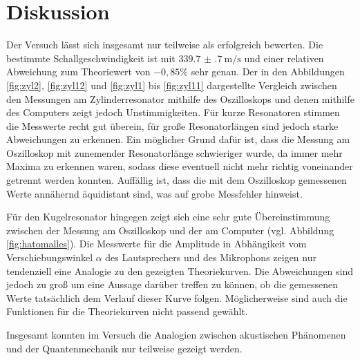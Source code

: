 \section{Diskussion}
\label{sec:Diskussion}

Der Versuch lässt sich insgesamt nur teilweise als erfolgreich bewerten. Die bestimmte
Schallgeschwindigkeit ist mit $\SI{339.7(7)}{\meter\per\second}$ und einer relativen Abweichung zum Theoriewert
von $-0{,}85\%$ sehr genau.
Der in den Abbildungen \ref{fig:zyl2}, \ref{fig:zyl12} und \ref{fig:zyl1} bis \ref{fig:zyl11}
dargestellte Vergleich zwischen den Messungen am Zylinderresonator mithilfe des Oszilloskops und denen mithilfe des
Computers zeigt jedoch Unstimmigkeiten. Für kurze Resonatoren stimmen die Messwerte recht
gut überein, für große Resonatorlängen sind jedoch starke Abweichungen zu erkennen. Ein möglicher
Grund dafür ist, dass die Messung am Oszilloskop mit zunemender Resonatorlänge schwieriger wurde,
da immer mehr Maxima zu erkennen waren, sodass diese eventuell nicht mehr richtig voneinander getrennt
werden konnten. Auffällig ist, dass die mit dem Oszilloskop gemessenen Werte annähernd
äquidistant sind, was auf grobe Messfehler hinweist.

Für den Kugelresonator hingegen zeigt sich eine sehr gute Übereinstimmung zwischen der Messung
am Oszilloskop und der am Computer (vgl. Abbildung \ref{fig:hatomalles}). Die Messwerte für die
Amplitude in Abhängikeit vom Verschiebungswinkel $\alpha$ des Lautsprechers und des Mikrophons
zeigen nur tendenziell eine Analogie zu den gezeigten Theoriekurven. Die Abweichungen sind
jedoch zu groß um eine Aussage darüber treffen zu können, ob die gemessenen Werte
tatsächlich dem Verlauf dieser Kurve folgen. Möglicherweise sind auch die Funktionen
für die Theoriekurven nicht passend gewählt.

Insgesamt konnten im Versuch die Analogien zwischen akustischen Phänomenen
und der Quantenmechanik nur teilweise gezeigt werden.
